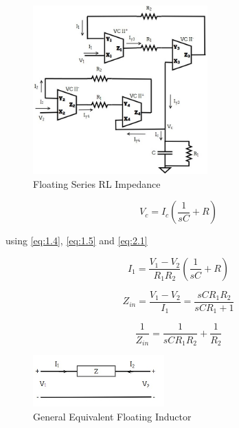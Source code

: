 \documentclass{./styles/svproc}
\begin{document}
\begin{figure}[h]
\begin{center}
    \includegraphics[width=0.6\textwidth]{series.jpg}
    \caption{Floating Series RL Impedance}
  \end{center}
\end{figure}


\begin{equation}\label{eq:2.1}
V_c=I_c \left( \frac{1}{sC}+R \right)
\end{equation}

using \eqref{eq:1.4}, \eqref{eq:1.5} and \eqref{eq:2.1}

\begin{equation}\label{eq:2.2}
I_1=\frac{V_1-V_2}{R_1R_2} \left( \frac{1}{sC}+R \right)
\end{equation}

\begin{equation}\label{eq:2.3}
Z_{in}=\frac{V_1-V_2}{I_1} = \frac{sCR_1R_2}{sCR_1+1}
\end{equation}

\begin{equation}\label{eq:2.4}
\frac{1}{Z_{in}} = \frac{1}{sCR_1R_2}+\frac{1}{R_2}
\end{equation}



\begin{figure}[h]
\begin{center}
     \includegraphics[width=0.45\textwidth]{templates/Generalfig.jpg}
    \caption{General Equivalent Floating Inductor}
  \end{center}
\end{figure}
\end{document}
